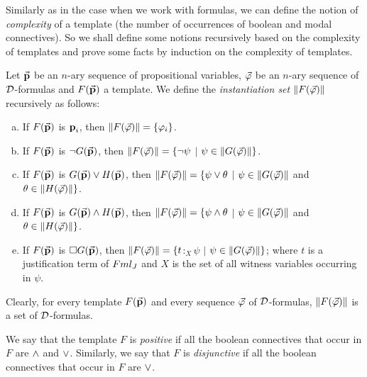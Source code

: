 \qquad Similarly as in the case when we work with formulas, we can define the notion of \textit{complexity} of a template (the number of occurrences of boolean and modal connectives). So we shall define some notions recursively based on the complexity of templates  and prove some facts by induction on the complexity of templates.


\begin{defn} 
	Let $\vec{\textbf{p}}$ be an $n$-ary sequence of propositional variables, $\vec{\varphi}$ be an $n$-ary sequence of $\mathcal{D}$-formulas and    $F(\vec{\textbf{p}})$ a template. We define the \textit{instantiation set} $\Arrowvert F(\vec{\varphi}) \Arrowvert$ recursively as follows:
	
	\begin{enumerate}[a)]
		
		\item If $F(\vec{\textbf{p}})$ is $\textbf{p}_{i}$, then $\Arrowvert F(\vec{\varphi}) \Arrowvert = \{ \varphi_{i}\}$.
		
		\item If $F(\vec{\textbf{p}})$ is $\neg G(\vec{\textbf{p}})$, then  $\Arrowvert F(\vec{\varphi}) \Arrowvert = \{ \neg \psi$ $|$ $\psi \in  \Arrowvert G(\vec{\varphi}) \Arrowvert   \}$.
		
		\item If $F(\vec{\textbf{p}})$ is $G(\vec{\textbf{p}}) \vee H(\vec{\textbf{p}})$, then  $\Arrowvert F(\vec{\varphi}) \Arrowvert = \{ \psi\vee \theta $ $|$ $\psi \in  \Arrowvert G(\vec{\varphi}) \Arrowvert$ and $\theta \in  \Arrowvert H(\vec{\varphi}) \Arrowvert  \}$.
		
		\item If $F(\vec{\textbf{p}})$ is $G(\vec{\textbf{p}}) \wedge H(\vec{\textbf{p}})$, then   $\Arrowvert F(\vec{\varphi}) \Arrowvert = \{ \psi\wedge \theta $ $|$ $\psi \in  \Arrowvert G(\vec{\varphi}) \Arrowvert$ and $\theta \in  \Arrowvert H(\vec{\varphi}) \Arrowvert  \}$.
		
		
		\item If $F(\vec{\textbf{p}})$ is  $\Box G(\vec{\textbf{p}})$, then   $\Arrowvert F(\vec{\varphi}) \Arrowvert = \{ t$$:_{X}$$\psi$ $|$ $\psi \in  \Arrowvert G(\vec{\varphi}) \Arrowvert   \}$; where $t$ is a justification term of $Fml_{J}$ and $X$ is the set of all witness variables occurring in $\psi$.
	\end{enumerate}
\end{defn}

\qquad Clearly, for every template $F(\vec{\textbf{p}})$ and every sequence $\vec{\varphi}$ of $\mathcal{D}$-formulas, $\Arrowvert F(\vec{\varphi}) \Arrowvert$ is a set of $\mathcal{D}$-formulas.  


\begin{defn}
	We say that the template $F$ is \textit{positive} if all the  boolean connectives that occur in $F$ are $\wedge$ and $\vee$. Similarly, we say that $F$ is \textit{disjunctive} if all the boolean connectives that occur in $F$ are $\vee$.           
\end{defn}


